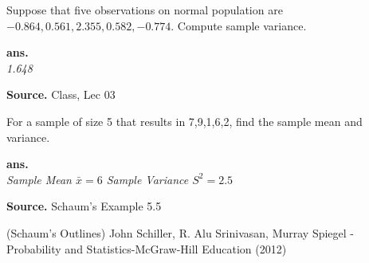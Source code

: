 \documentclass[12pt,twoside]{report}
\newenvironment*{ans}{\textbf{ans.}\space\em\\}{\par}
\newenvironment*{source}{\hfill\scriptsize\textbf{Source.}\space}{\par}
\begin{document}
\begin{samepage}
\begin{ex}
Suppose that five observations on normal population are \\
$-0.864, 0.561, 2.355, 0.582, -0.774$.
Compute sample variance.
\end{ex}
\begin{ans}
1.648
\end{ans}
\begin{source}
Class, Lec 03
\end{source}
\end{samepage}

\begin{samepage}
\begin{ex}
    For a sample of size 5 that results in 7,9,1,6,2, find the sample mean and variance.
\end{ex}
\begin{ans}
Sample Mean $\bar{x} = 6$
Sample Variance $S^2 = 2.5$
\end{ans}
\begin{source}
Schaum's Example 5.5
\end{source}
\end{samepage}

\newpage
{}
\begin{thebibliography}{9}
        (Schaum’s Outlines) John Schiller, R. Alu Srinivasan, Murray Spiegel - Probability and Statistics-McGraw-Hill Education (2012)
        \lipsum[2][1-3]
        \lipsum[3][1-3]
        \lipsum[4][1-3]
        \lipsum[5][1-3]
        \lipsum[6][1-3]
\end{thebibliography}
\end{document}
